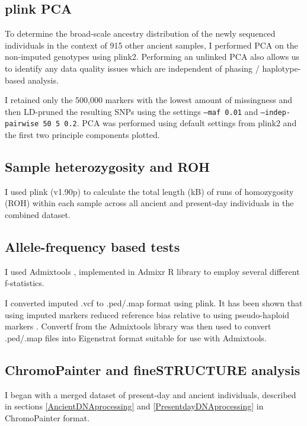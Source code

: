 \subsection{plink PCA}

To determine the broad-scale ancestry distribution of the newly sequenced individuals in the context of 915 other ancient samples, I performed PCA on the non-imputed genotypes using plink2. Performing an unlinked PCA also allows us to identify any data quality issues which are independent of phasing / haplotype-based analysis. 

I retained only the 500,000 markers with the lowest amount of missingness and then LD-pruned the resulting SNPs using the settings \texttt{--maf 0.01} and \texttt{--indep-pairwise 50 5 0.2}. PCA was performed using default settings from plink2 and the first two principle components plotted.

\subsection{Sample heterozygosity and ROH}

I used plink (v1.90p) to calculate the total length (kB) of runs of homozygosity (ROH) within each sample across all ancient and present-day individuals in the combined dataset. 

\subsection{Allele-frequency based tests}

I used Admixtools \cite{Patterson2012}, implemented in Admixr R library \cite{admixrpetr2019} to employ several different f-statistics. 

I converted imputed .vcf to .ped/.map format using plink. It has been shown that using imputed markers reduced reference bias relative to using pseudo-haploid markers \cite{Martiniano2017}. Convertf from the Admixtools library was then used to convert .ped/.map files into Eigenstrat format suitable for use with Admixtools. 

\subsection{ChromoPainter and fineSTRUCTURE analysis}

I began with a merged dataset of present-day and ancient individuals, described in sections \ref{AncientDNAprocessing} and \ref{PresentdayDNAprocessing} in ChromoPainter format. 

